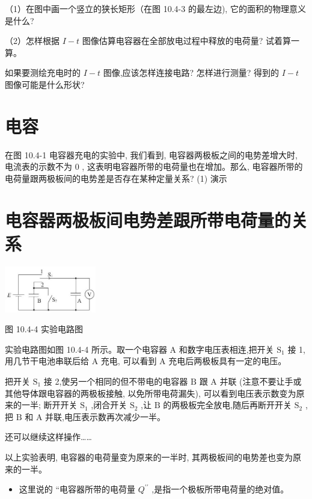 \documentclass[10pt]{article}
\begin{document}
（1）在图中画一个竖立的狭长矩形（在图 10.4-3 的最左边), 它的面积的物理意义是什么?

（2）怎样根据 \(I - t\) 图像估算电容器在全部放电过程中释放的电荷量? 试着算一算。

如果要测绘充电时的 \(I - t\) 图像,应该怎样连接电路? 怎样进行测量? 得到的 \(I - t\) 图像可能是什么形状?

\section*{电容}

在图 10.4-1 电容器充电的实验中, 我们看到, 电容器两极板之间的电势差增大时, 电流表的示数不为 0 , 这表明电容器所带的电荷量也在增加。那么, 电容器所带的电荷量跟两极板间的电势差是否存在某种定量关系? (1) 演示

\section*{电容器两极板间电势差跟所带电荷量的关系}

\begin{center}
\includegraphics[max width=0.3\textwidth]{images/01911d5f-8e38-70c0-b5b8-2b399bd115b6_45_437478.jpg}
\end{center}

图 10.4-4 实验电路图

实验电路图如图 10.4-4 所示。取一个电容器 \(\mathrm{A}\) 和数字电压表相连,把开关 \({\mathrm{S}}_{1}\) 接 1,用几节干电池串联后给 \(\mathrm{A}\) 充电, 可以看到 \(\mathrm{A}\) 充电后两极板具有一定的电压。

把开关 \({\mathrm{S}}_{1}\) 接 2,使另一个相同的但不带电的电容器 \(\mathrm{B}\) 跟 A 并联 (注意不要让手或其他导体跟电容器的两极板接触, 以免所带电荷漏失), 可以看到电压表示数变为原来的一半; 断开开关 \({\mathrm{S}}_{1}\) ,闭合开关 \({\mathrm{S}}_{2}\) ,让 \(\mathrm{B}\) 的两极板完全放电,随后再断开开关 \({\mathrm{S}}_{2}\) ,把 \(\mathrm{B}\) 和 \(\mathrm{A}\) 并联,电压表示数再次减少一半。

还可以继续这样操作……

以上实验表明, 电容器的电荷量变为原来的一半时, 其两极板间的电势差也变为原来的一半。

\begin{mdframed}

\begin{itemize}
\item 这里说的 “电容器所带的电荷量 \({Q}^{\prime \prime }\) ,是指一个极板所带电荷量的绝对值。
\end{itemize}

\end{mdframed}
\end{document}
